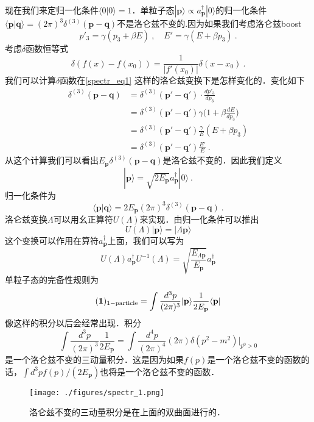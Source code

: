 现在我们来定归一化条件$\langle 0 | 0 \rangle = 1$．单粒子态$|\mathbf p\rangle \propto a^\dagger_{\mathbf p} | 0 \rangle$的归一化条件$\langle \mathbf p| \mathbf q\rangle = (2\pi)^3\delta^{(3)}(\mathbf p - \mathbf q)$不是洛仑兹不变的.因为如果我们考虑洛仑兹boost
\begin{equation}\label{spectr_eq1}
p'_3 = \gamma (p_3+\beta E)~,\quad E' = \gamma(E+\beta p_3)~.
\end{equation}
考虑$\delta$函数恒等式
\begin{equation}
\delta (f(x) - f(x_0)) = \frac{1}{|f'(x_0)|}\delta(x-x_0)~.
\end{equation}
我们可以计算$\delta$函数在\autoref{spectr_eq1} 这样的洛仑兹变换下是怎样变化的．变化如下
\begin{equation}
\begin{aligned}
\delta^{(3)}(\mathbf p - \mathbf q) & = \delta^{(3)}(\mathbf p' - \mathbf q') \cdot \frac{dp'_3}{dp_3}\\
& = \delta^{(3)}(\mathbf p' - \mathbf q') \gamma \bigg( 1+\beta \frac{dE}{dp_3} \bigg) \\
& = \delta^{(3)}(\mathbf p' - \mathbf q') \frac{\gamma}{E} (E+ \beta p_3) \\
& = \delta^{(3)} (\mathbf p'-\mathbf q') \frac{E'}{E}~.
\end{aligned}
\end{equation}
从这个计算我们可以看出$E_{\mathbf p}\delta^{(3)}(\mathbf p - \mathbf q)$是洛仑兹不变的．因此我们定义
\begin{equation}
|\mathbf p \rangle = \sqrt{2 E_{\mathbf p}} a^\dagger_{\mathbf p} | 0 \rangle~.
\end{equation}
归一化条件为
\begin{equation}
\langle \mathbf p | \mathbf q \rangle = 2 E_{\mathbf p} (2\pi)^3 \delta^{(3)} (\mathbf p - \mathbf q)~. 
\end{equation}
洛仑兹变换$\Lambda$可以用幺正算符$U(\Lambda)$来实现．由归一化条件可以推出
\begin{equation}
U(\Lambda)|\mathbf p\rangle = |\Lambda \mathbf p \rangle 
\end{equation}
这个变换可以作用在算符$a^\dagger_{\mathbf p}$上面，我们可以写为
\begin{equation}
U(\Lambda)a^\dagger_{\mathbf p}U^{-1}(\Lambda) = \sqrt{\frac{E_{\Lambda \mathbf p}}{E_{\mathbf p}}} a^\dagger_{\mathbf p}
\end{equation}
单粒子态的完备性规则为
\begin{equation}
(\boldsymbol 1)_{\rm 1-particle} = \int \frac{d^3p}{(2\pi)^3} |\mathbf p\rangle \frac{1}{2 E_{\mathbf p}} \langle \mathbf p |
\end{equation}
像这样的积分以后会经常出现．积分
\begin{equation}
\int \frac{d^3p}{(2\pi)^3} \frac{1}{2 E_{\mathbf p}} = \int \frac{d^4 p}{(2\pi)^4} (2\pi) \delta(p^2 - m^2) \bigg|_{p^0>0}
\end{equation}
是一个洛仑兹不变的三动量积分．这是因为如果$f(p)$是一个洛仑兹不变的函数的话，$\int d^3 p f(p)/(2E_{\mathbf p})$也将是一个洛仑兹不变的函数．
\begin{figure}[ht]
\centering
\texttt{[image: ./figures/spectr\_1.png]}
\caption{洛仑兹不变的三动量积分是在上面的双曲面进行的．} \label{spectr_fig1}
\end{figure}
